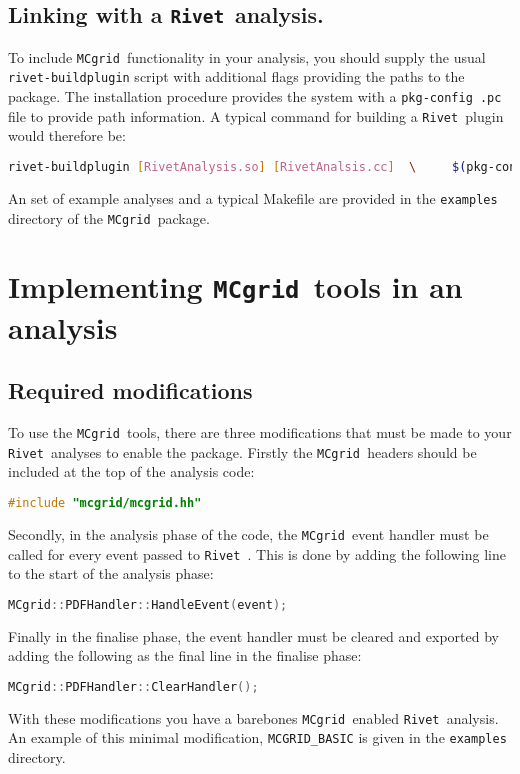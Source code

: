 \documentclass[11pt]{article}
\newcommand{\mcgrid} {{\tt MCgrid }}
\newcommand{\rivet} {{\tt Rivet }}
\begin{document}
\subsection{Linking with a \rivet analysis.}
To include \mcgrid functionality in your analysis, you should supply the usual \lstinline[language=bash]{rivet-buildplugin} script with additional flags providing the paths to the package. The installation procedure provides the system with a \lstinline[language=bash]{pkg-config .pc} file to provide path information. A typical command for building a \rivet plugin would therefore be:
\begin{lstlisting}[language=bash]
 rivet-buildplugin [RivetAnalysis.so] [RivetAnalsis.cc]  \     $(pkg-config mcgrid --cflags) $(pkg-config mcgrid --libs)
\end{lstlisting}
An set of example analyses and a typical Makefile are provided in the \lstinline[language=bash]{examples} directory of the \mcgrid package.

\section{Implementing \mcgrid tools in an analysis}
\subsection{Required modifications}
To use the \mcgrid tools, there are three modifications that must be made to your \rivet analyses to enable the package.
Firstly the \mcgrid headers should be included at the top of the analysis code:
\begin{lstlisting}[language=c++]
	#include "mcgrid/mcgrid.hh"
\end{lstlisting}
Secondly, in the analysis phase of the code, the \mcgrid event handler must be called for every event passed to \rivet. This is done by adding the following line to the start of the analysis phase:
\begin{lstlisting}[language=c++]
	MCgrid::PDFHandler::HandleEvent(event);
\end{lstlisting}
Finally in the finalise phase, the event handler must be cleared and exported by adding the following as the final line in the finalise phase:
\begin{lstlisting}[language=c++]
	MCgrid::PDFHandler::ClearHandler();
\end{lstlisting}
With these modifications you have a barebones \mcgrid enabled \rivet analysis. An example of this minimal modification, \lstinline[language=bash]{MCGRID_BASIC} is given in the \lstinline[language=bash]{examples} directory.
\end{document}
